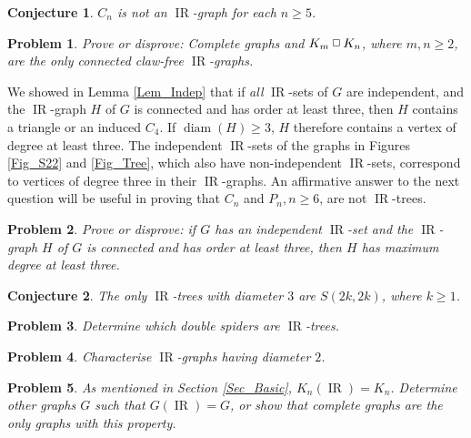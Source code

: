 \documentclass[12pt]{article}%
\newtheorem{conjecture}{Conjecture}
\newtheorem{problem}{Problem}
\providecommand{\boksie}{\ensuremath{\mathbin{\raisebox{0.3mm}{$\scriptstyle\square$}}}}
\begin{document}
\begin{conjecture}
$C_{n}$ is not an $\operatorname{IR}$-graph for each $n\geq5$.
\end{conjecture}

\begin{problem}
Prove or disprove: Complete graphs and $K_{m}\boksie K_{n}$, where $m,n\geq2$,
are the only connected claw-free $\operatorname{IR}$-graphs.
\end{problem}

We showed in Lemma \ref{Lem_Indep} that if \emph{all} $\operatorname{IR}$-sets
of $G$ are independent, and the $\operatorname{IR}$-graph $H$ of $G$ is
connected and has order at least three, then $H$ contains a triangle or an
induced $C_{4}$. If $\operatorname{diam}(H)\geq3$, $H$ therefore contains a
vertex of degree at least three. The independent $\operatorname{IR}$-sets of
the graphs in Figures \ref{Fig_S22} and \ref{Fig_Tree}, which also have
non-independent $\operatorname{IR}$-sets, correspond to vertices of degree
three in their $\operatorname{IR}$-graphs. An affirmative answer to the next
question will be useful in proving that $C_{n}$ and $P_{n},n\geq6$, are not
$\operatorname{IR}$-trees.

\begin{problem}
Prove or disprove: if $G$ has an independent $\operatorname{IR}$-set and the
$\operatorname{IR}$-graph $H$ of $G$ is connected and has order at least
three, then $H$ has maximum degree at least three.
\end{problem}

\begin{conjecture}
\label{Con_doublestar}The only $\operatorname{IR}$-trees with diameter $3$ are
$S(2k,2k)$, where $k\geq1$.
\end{conjecture}

\begin{problem}
Determine which double spiders are $\operatorname{IR}$-trees.
\end{problem}

\begin{problem}
Characterise $\operatorname{IR}$-graphs having diameter $2$.
\end{problem}

\begin{problem}
As mentioned in Section \ref{Sec_Basic}, $K_{n}(\operatorname{IR})=K_{n}$.
Determine other graphs $G$ such that $G(\operatorname{IR})=G$, or show that
complete graphs are the only graphs with this property.\label{refs}
\end{problem}
\end{document}
